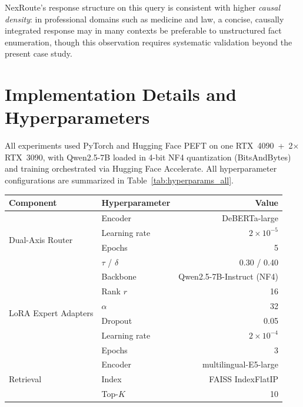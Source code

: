 \documentclass[a4paper,fleql]{cas-sc}
\begin{document}
NexRoute's response structure on this query is consistent with higher
\textit{causal density}: in professional domains such as medicine and law,
a concise, causally integrated response may in many contexts be preferable
to unstructured fact enumeration, though this observation requires systematic
validation beyond the present case study.

\section{Implementation Details and Hyperparameters}
\label{sec:implementation}
All experiments used PyTorch and Hugging Face PEFT on one RTX~4090\ +\ 2$\times$RTX~3090, with Qwen2.5-7B loaded in 4-bit NF4 quantization (BitsAndBytes) and training orchestrated via Hugging Face Accelerate. All hyperparameter configurations are summarized in Table~\ref{tab:hyperparams_all}.

\vspace{6pt plus 4pt minus 3pt}
\begin{center}
\begingroup
{}
\label{tab:hyperparams_all}
\begin{tabular}{llr}
\toprule
\textbf{Component} & \textbf{Hyperparameter} & \textbf{Value} \\
\midrule
\multirow{4}{*}{Dual-Axis Router}
  & Encoder           & DeBERTa-large \\
  & Learning rate     & $2 \times 10^{-5}$ \\
  & Epochs            & 5 \\
  & $\tau$ / $\delta$ & 0.30 / 0.40 \\
\midrule
\multirow{6}{*}{LoRA Expert Adapters}
  & Backbone        & Qwen2.5-7B-Instruct (NF4) \\
  & Rank $r$        & 16 \\
  & $\alpha$        & 32 \\
  & Dropout         & 0.05 \\
  & Learning rate   & $2 \times 10^{-4}$ \\
  & Epochs          & 3 \\
\midrule
\multirow{3}{*}{Retrieval}
  & Encoder  & multilingual-E5-large \\
  & Index    & FAISS IndexFlatIP \\
  & Top-$K$  & 10 \\
\bottomrule
\end{tabular}
\endgroup
\end{center}
\vspace{6pt plus 4pt minus 3pt}
\end{document}
